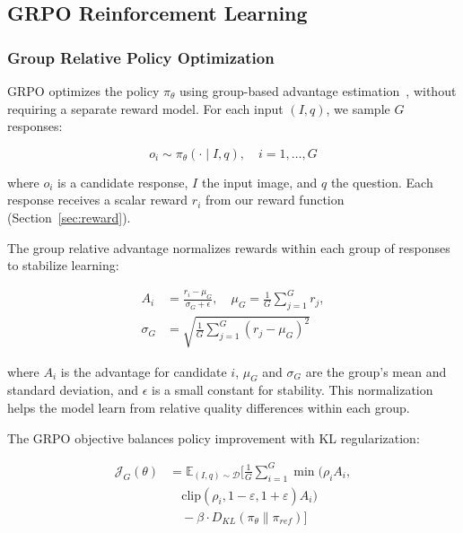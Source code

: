 \documentclass[sigconf,anonymous,review]{acmart}
\begin{document}
\subsection{GRPO Reinforcement Learning}
\label{sec:grpo}

\subsubsection{Group Relative Policy Optimization}

GRPO optimizes the policy $\pi_\theta$ using group-based advantage estimation~\cite{zheng2025group}, without requiring a separate reward model. For each input $(I, q)$, we sample $G$ responses:

\begin{equation}
o_i \sim \pi_\theta(\cdot \mid I, q), \quad i = 1, \ldots, G
\label{eq:sample}
\end{equation}

\noindent where $o_i$ is a candidate response, $I$ the input image, and $q$ the question. Each response receives a scalar reward $r_i$ from our reward function (Section~\ref{sec:reward}).

\noindent The group relative advantage normalizes rewards within each group of responses to stabilize learning:

\begin{equation}
\begin{aligned}
A_i &= \frac{r_i - \mu_G}{\sigma_G + \epsilon}, \quad
\mu_G = \frac{1}{G}\sum_{j=1}^G r_j, \\
\sigma_G &= \sqrt{\frac{1}{G}\sum_{j=1}^G (r_j - \mu_G)^2}
\end{aligned}
\label{eq:advantage}
\end{equation}

\noindent where $A_i$ is the advantage for candidate $i$, $\mu_G$ and $\sigma_G$ are the group's mean and standard deviation, and $\epsilon$ is a small constant for stability. This normalization helps the model learn from relative quality differences within each group.

The GRPO objective balances policy improvement with KL regularization:

\begin{equation}
\begin{aligned}
\mathcal{J}_G(\theta) &= \mathbb{E}_{(I,q)\sim\mathcal{D}} \Bigg[
\frac{1}{G} \sum_{i=1}^G \min\big( \rho_i A_i, \\
&\quad \text{clip}(\rho_i, 1-\varepsilon, 1+\varepsilon) A_i \big) \\
&\quad - \beta \cdot D_{KL}(\pi_\theta \| \pi_{ref}) \Bigg]
\end{aligned}
\label{eq:grpo_objective}
\end{equation}
\end{document}

